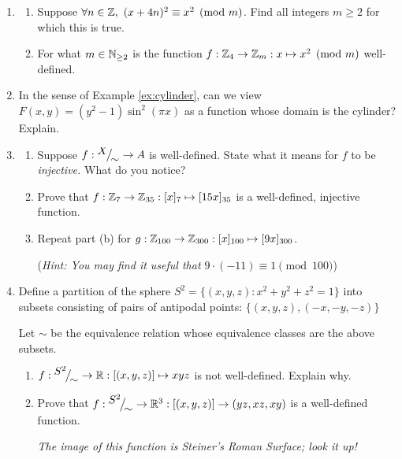 \begin{exercises}{}{}
\begin{enumerate}
	
		\item\begin{enumerate}
		  \item Suppose $\forall n\in\Z,\ (x+4n)^2\equiv x^2\pmod m$. Find all integers $m\ge 2$ for which this is true.
		  \item For what $m\in\mathbb{N}_{\ge 2}$ is the function $f:\mathbb{Z}_4\to\mathbb{Z}_m:x\mapsto x^2\pmod m$ well-defined.
		\end{enumerate}
		
		
		\item In the sense of Example \ref{ex:cylinder}, can we view $F(x,y)=(y^2-1)\sin^2(\pi x)$ as a function whose domain is the cylinder? Explain. 
		
		
		\goodbreak
		
			
		\item\begin{enumerate}
		  \item Suppose $f:\smash{{}^{\textstyle {X}}\!\big/_{\textstyle \!{\sim}}}\to A$ is well-defined. State what it means for $f$ to be \emph{injective.} What do you notice?
		  \item Prove that $f:\mathbb{Z}_7\to\mathbb{Z}_{35}:[x]_7\mapsto [15x]_{35}$ is a well-defined, injective function.
		  \item Repeat part (b) for $g:\mathbb{Z}_{100}\to\mathbb{Z}_{300}:[x]_{100}\mapsto [9x]_{300}$.\par
		  (\emph{Hint: You may find it useful that $9\cdot(-11)\equiv 1\pmod{100}$})
		\end{enumerate}
		
		
		\item Define a partition of the sphere $S^2=\bigl\{(x,y,z):x^2+y^2+z^2=1\bigr\}$ into subsets consisting of pairs of antipodal points:
			$\bigl\{(x,y,z),(-x,-y,-z)\bigr\}$\par
		Let $\sim$ be the equivalence relation whose equivalence classes are the above subsets.
		\begin{enumerate}
		  \item $f:\smash{{}^{\textstyle {S^2}}\!\big/_{\textstyle \!{\sim}}}\to\mathbb{R}:[(x,y,z)]\mapsto xyz$ is not well-defined. Explain why.
		  \item Prove that $f:{}^{\textstyle {S^2}}\!\big/_{\textstyle \!{\sim}}\to\mathbb{R}^3:[(x,y,z)]\to(yz,xz,xy)$ is a well-defined function.\par
			\emph{The image of this function is Steiner's Roman Surface; look it up!}
		\end{enumerate}
			

\end{enumerate}
\end{exercises}
